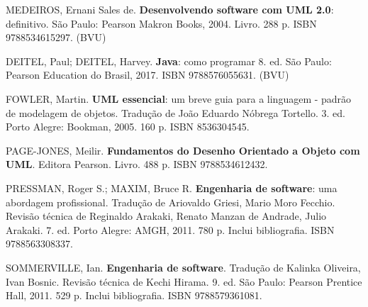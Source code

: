 \begin{pud}
\begin{bibbasica}
		\item MEDEIROS, Ernani Sales de. \textbf{Desenvolvendo software com UML 2.0}: definitivo. São Paulo:  Pearson Makron Books, 2004. Livro. 288 p. ISBN 9788534615297. (BVU)
	\end{bibbasica}
	
	\begin{bibcomplementar}
    
 		\item DEITEL, Paul; DEITEL, Harvey. \textbf{Java}: como programar 8. ed. São Paulo: Pearson Education do Brasil, 2017. ISBN 9788576055631. (BVU)
		\item FOWLER, Martin. \textbf{UML essencial}: um breve guia para a linguagem - padrão de modelagem de objetos. Tradução de João Eduardo Nóbrega Tortello. 3. ed. Porto Alegre: Bookman, 2005. 160 p. ISBN 8536304545.
		\item PAGE-JONES, Meilir. \textbf{Fundamentos do Desenho Orientado a Objeto com UML}. Editora Pearson. Livro. 488 p. ISBN 9788534612432. 
		\item PRESSMAN, Roger S.; MAXIM, Bruce R. \textbf{Engenharia de software}: uma abordagem profissional. Tradução de Ariovaldo Griesi, Mario Moro Fecchio. Revisão técnica de Reginaldo Arakaki, Renato Manzan de Andrade, Julio Arakaki. 7. ed. Porto Alegre: AMGH, 2011. 780 p. Inclui bibliografia. ISBN 9788563308337.				 
		
		\item SOMMERVILLE, Ian. \textbf{Engenharia de software}. Tradução de Kalinka Oliveira, Ivan Bosnic. Revisão técnica de Kechi Hirama. 9. ed. São Paulo: Pearson Prentice Hall, 2011. 529 p. Inclui bibliografia. ISBN 9788579361081.	
		
		
	\end{bibcomplementar}
	
	
    	
	
\end{pud}


